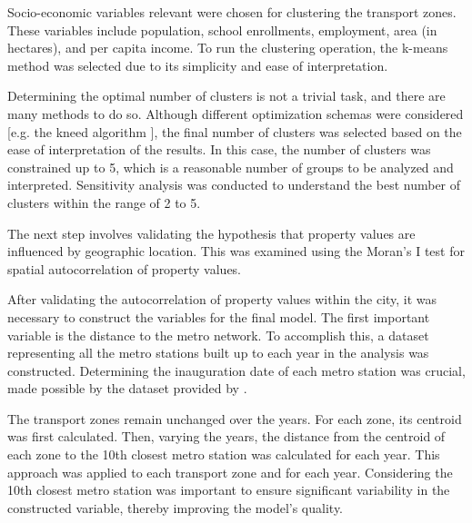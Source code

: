 \documentclass[12pt]{gsis} %
\begin{document}
Socio-economic variables relevant were chosen for clustering the transport zones.
These variables include population, school enrollments, employment, area (in hectares), and per capita income.
To run the clustering operation, the k-means method \citep{macqueen1967some} was selected due to its simplicity and ease of interpretation.

Determining the optimal number of clusters is not a trivial task, and there are many methods to do so.
Although different optimization schemas were considered [e.g. the kneed algorithm \citep{Arvai_kneed_2020}], the final number of clusters was selected based on the ease of interpretation of the results.
In this case, the number of clusters was constrained up to 5, which is a reasonable number of groups to be analyzed and interpreted.
Sensitivity analysis was conducted to understand the best number of clusters within the range of 2 to 5.


The next step involves validating the hypothesis that property values are influenced by geographic location.
This was examined using the Moran's I test \citep{moran} for spatial autocorrelation of property values.


After validating the autocorrelation of property values within the city, it was necessary to construct the variables for the final model.
The first important variable is the distance to the metro network.
To accomplish this, a dataset representing all the metro stations built up to each year in the analysis was constructed.
Determining the inauguration date of each metro station was crucial, made possible by the dataset provided by \citet{kaggle_dataset}.

The transport zones remain unchanged over the years.
For each zone, its centroid was first calculated.
Then, varying the years, the distance from the centroid of each zone to the 10th closest metro station was calculated for each year.
This approach was applied to each transport zone and for each year.
Considering the 10th closest metro station was important to ensure significant variability in the constructed variable, thereby improving the model's quality.
\end{document}
